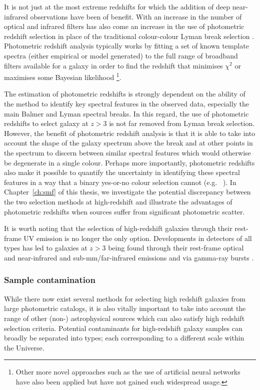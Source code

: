 It is not just at the most extreme redshifts for which the addition of deep near-infrared observations have been of benefit. With an increase in the number of optical and infrared filters has also come an increase in the use of photometric redshift selection in place of the traditional colour-colour Lyman break selection \citep{McLure:2006fg,McLure:2010hq}. Photometric redshift analysis typically works by fitting a set of known template spectra (either empirical or model generated) to the full range of broadband filters available for a galaxy in order to find the redshift that minimises $\chi^{2}$ \citep{Bolzonella:2000uw,Brammer:2008gn} or maximises some Bayesian likelihood \citep{Benitez:2000jr}\footnote{Other more novel approaches such as the use of artificial neural networks \citep{Collister:2004fx} have also been applied but have not gained such widespread usage.}.

The estimation of photometric redshifts is strongly dependent on the ability of the method to identify key spectral features in the observed data, especially the main Balmer and Lyman spectral breaks. In this regard, the use of photometric redshifts to select galaxy at $z > 3$ is not far removed from Lyman break selection. However, the benefit of photometric redshift analysis is that it is able to take into account the shape of the galaxy spectrum above the break and at other points in the spectrum to discern between similar spectral features which would otherwise be degenerate in a single colour. Perhaps more importantly, photometric redshifts also make it possible to quantify the uncertainty in identifying these spectral features in a way that a binary yes-or-no colour selection cannot (e.g. \citeauthor{Dunlop:2007fo}~\citeyear{Dunlop:2007fo}). In Chapter~\ref{ch:smf} of this thesis, we investigate the potential discrepancy between the two selection methods at high-redshift and illustrate the advantages of photometric redshifts when sources suffer from significant photometric scatter.

It is worth noting that the selection of high-redshift galaxies through their rest-frame UV emission is no longer the only option. Developments in detectors of all types has led to galaxies at $z > 3$ being found through their rest-frame optical and near-infrared \citep{Franx:2003cx,vanDokkum:2003bl} and sub-mm/far-infrared \citep{Walter:2003ul,Robson:2004gu} emissions and via gamma-ray bursts \citep{Haislip:2006gx,Kawai:2006kk,Tanvir:2009gq}.

\subsubsection{Sample contamination}
While there now exist several methods for selecting high redshift galaxies from large photometric catalogs, it is also vitally important to take into account the range of other (non-) astrophysical sources which can also satisfy high redshift selection criteria. Potential contaminants for high-redshift galaxy samples can broadly be separated into types; each corresponding to a different scale within the Universe.


